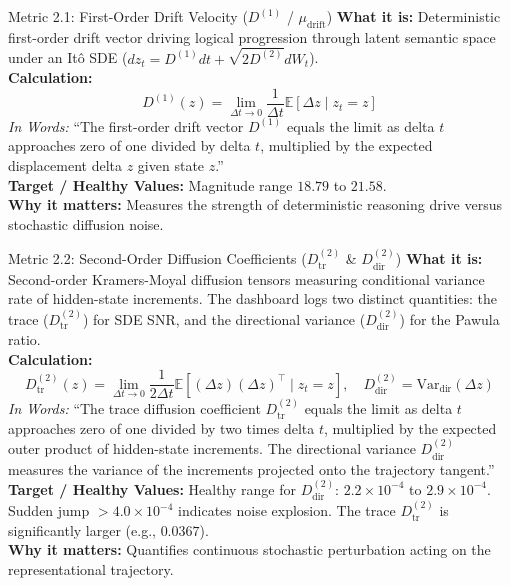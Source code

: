 \documentclass[11pt,a4paper]{article}
\begin{document}
\begin{metricbox}{Metric 2.1: First-Order Drift Velocity ($D^{(1)}$ / $\mu_{\text{drift}}$)}
\textbf{What it is:} Deterministic first-order drift vector driving logical progression through latent semantic space under an It\^o SDE ($dz_t = D^{(1)} dt + \sqrt{2D^{(2)}} dW_t$).\\
\textbf{Calculation:}
 $$D^{(1)}(z) = \lim_{\Delta t \to 0} \frac{1}{\Delta t} \mathbb{E}\left[\Delta z \mid z_t = z\right]$$ \emph{In Words:} ``The first-order drift vector $D^{(1)}$ equals the limit as delta $t$ approaches zero of one divided by delta $t$, multiplied by the expected displacement delta $z$ given state $z$.''\\
\textbf{Target / Healthy Values:} Magnitude range $18.79$ to $21.58$.\\
\textbf{Why it matters:} Measures the strength of deterministic reasoning drive versus stochastic diffusion noise.
\end{metricbox}

\begin{metricbox}{Metric 2.2: Second-Order Diffusion Coefficients ($D^{(2)}_{\text{tr}}$ \& $D^{(2)}_{\text{dir}}$)}
\textbf{What it is:} Second-order Kramers-Moyal diffusion tensors measuring conditional variance rate of hidden-state increments. The dashboard logs two distinct quantities: the trace ($D^{(2)}_{\text{tr}}$) for SDE SNR, and the directional variance ($D^{(2)}_{\text{dir}}$) for the Pawula ratio.\\
\textbf{Calculation:}
 $$D^{(2)}_{\text{tr}}(z) = \lim_{\Delta t \to 0} \frac{1}{2\Delta t} \mathbb{E}\left[(\Delta z)(\Delta z)^\top \mid z_t = z\right], \quad D^{(2)}_{\text{dir}} = \text{Var}_{\text{dir}}(\Delta z)$$ \emph{In Words:} ``The trace diffusion coefficient $D^{(2)}_{\text{tr}}$ equals the limit as delta $t$ approaches zero of one divided by two times delta $t$, multiplied by the expected outer product of hidden-state increments. The directional variance $D^{(2)}_{\text{dir}}$ measures the variance of the increments projected onto the trajectory tangent.''\\
\textbf{Target / Healthy Values:} Healthy range for $D^{(2)}_{\text{dir}}$: $2.2 \times 10^{-4}$ to $2.9 \times 10^{-4}$. Sudden jump $> 4.0 \times 10^{-4}$ indicates noise explosion. The trace $D^{(2)}_{\text{tr}}$ is significantly larger (e.g., $0.0367$).\\
\textbf{Why it matters:} Quantifies continuous stochastic perturbation acting on the representational trajectory.
\end{metricbox}
\end{document}
